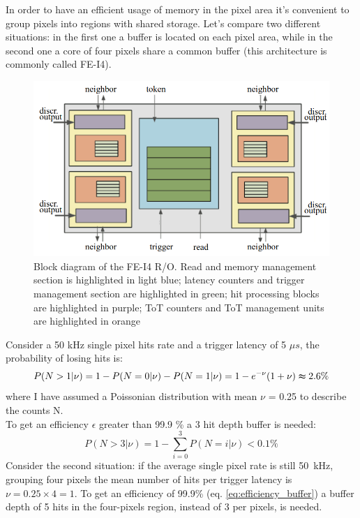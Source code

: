    In order to have an efficient usage of memory in the pixel area it's convenient to group pixels into regions with shared storage. Let's compare two different situations: in the first one a buffer is located on each pixel area, while in the second one a core of four pixels share a common buffer (this architecture is commonly called FE-I4). \\
   \begin{figure}[h!]
      \centering
      \includegraphics[width=.7\linewidth]{figures/Pixel_detectors/core.png}
      \caption{Block diagram of the FE-I4 R/O. Read and memory
      management section is highlighted in light blue; latency counters and
      trigger management section are highlighted in green; hit processing blocks
      are highlighted in purple; ToT counters and ToT management units are
      highlighted in orange}
      \label{fig:core}
   \end{figure}
   Consider a 50 kHz single pixel hits rate and a trigger latency of 5 $\mu s$, the probability of losing hits is: 
   \begin{equation}
      P(N > 1 | \nu) = 1-P(N = 0 | \nu) - P(N = 1 | \nu) = 1 - e^{-\nu} (1+\nu) \thickapprox 2.6 \% 
   \end{equation}    
   where I have assumed a Poissonian distribution with mean $\nu$ = 0.25 to describe the counts N.\\
   To get an efficiency $\epsilon$ greater than 99.9 \% a 3 hit depth buffer is needed: 
   \begin{equation}
      P(N > 3 | \nu) = 1-\sum_{i=0}^{3} P(N = i | \nu) < 0.1\%  
   \label{eq:efficiency_buffer}
   \end{equation} 
   Consider the second situation: if the average single pixel rate is still \SI{50}{kHz}, grouping four pixels the mean number of hits per trigger latency is $\nu = 0.25 \times 4 = 1$. To get an efficiency of 99.9\% (eq. \ref{eq:efficiency_buffer}) a buffer depth of 5 hits in the four-pixels region, instead of 3 per pixels, is needed. 


